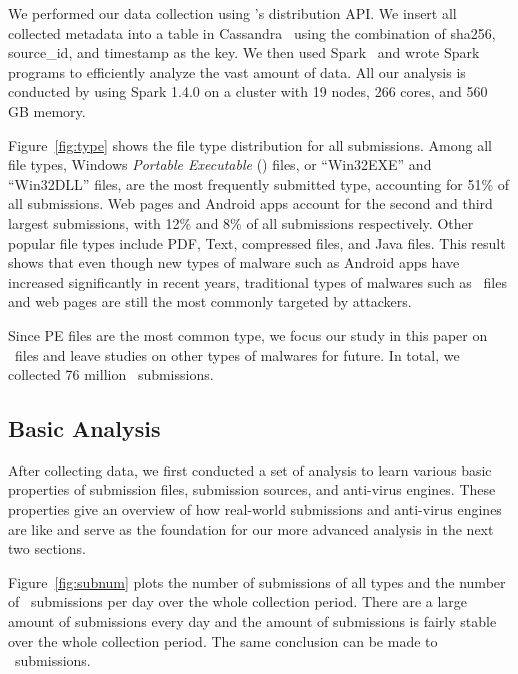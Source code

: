 We performed our data collection using \vt{}’s distribution API.
We insert all collected metadata into a table in Cassandra~\cite{cassandra} 
using the combination of sha256, source\_id, and timestamp as the key.
We then used Spark~\cite{spark} and wrote Spark programs to efficiently analyze the vast amount of data.
All our analysis is conducted by using Spark 1.4.0 on a cluster with 19 nodes, 266 cores, and 560 GB memory. 



Figure~\ref{fig:type} shows the file type distribution for all submissions. 
Among all file types, Windows \textit{Portable Executable} ({\em \pe}) files, or ``Win32EXE'' and ``Win32DLL'' files, 
are the most frequently submitted type,
accounting for 51\% of all submissions.
Web pages and Android apps account for the second and third largest submissions, 
with 12\% and 8\% of all submissions respectively. 
Other popular file types include PDF, Text, compressed files, and Java files. 
This result shows that even though new types of malware such as Android apps have
increased significantly in recent years, 
traditional types of malwares such as \pe\ files and web pages are still the 
most commonly targeted by attackers.

Since PE files are the most common type,
we focus our study in this paper on \pe\ files 
and leave studies on other types of malwares for future. 
In total, we collected 76 million \pe\ submissions.

\subsection{Basic Analysis}
\label{sec:basicanal}
After collecting data, we first conducted a set of analysis 
to learn various basic properties of submission files, 
submission sources, and anti-virus engines.
These properties give an overview of how real-world submissions and anti-virus engines are like
and serve as the foundation for our more advanced analysis in the next two sections. 





Figure~\ref{fig:subnum} plots the number of submissions of all types and the number of \pe\ submissions per day 
over the whole collection period.
There are a large amount of submissions every day
and the amount of submissions is fairly stable over the whole collection period.
The same conclusion can be made to \pe\ submissions.

